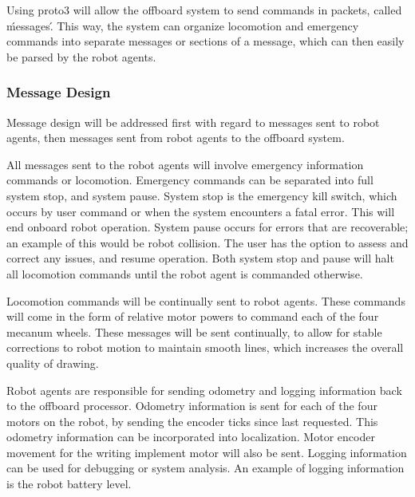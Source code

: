 Using proto3 will allow the offboard system to send commands in packets, called \'messages\'. This way, the system can organize locomotion and emergency commands into separate messages or sections of a message, which can then easily be parsed by the robot agents.

\subsubsection{Message Design}
\label{sec:software_comm_msg}
Message design will be addressed first with regard to messages sent to robot agents, then messages sent from robot agents to the offboard system.

All messages sent to the robot agents will involve emergency information commands or locomotion. Emergency commands can be separated into full system stop, and system pause. System stop is the emergency kill switch, which occurs by user command or when the system encounters a fatal error. This will end onboard robot operation. System pause occurs for errors that are recoverable; an example of this would be robot collision. The user has the option to assess and correct any issues, and resume operation. Both system stop and pause will halt all locomotion commands until the robot agent is commanded otherwise.

Locomotion commands will be continually sent to robot agents. These commands will come in the form of relative motor powers to command each of the four mecanum wheels. These messages will be sent continually, to allow for stable corrections to robot motion to maintain smooth lines, which increases the overall quality of drawing.

Robot agents are responsible for sending odometry and logging information back to the offboard processor. Odometry information is sent for each of the four motors on the robot, by sending the encoder ticks since last requested. This odometry information can be incorporated into localization. Motor encoder movement for the writing implement motor will also be sent. Logging information can be used for debugging or system analysis. An example of logging information is the robot battery level.


